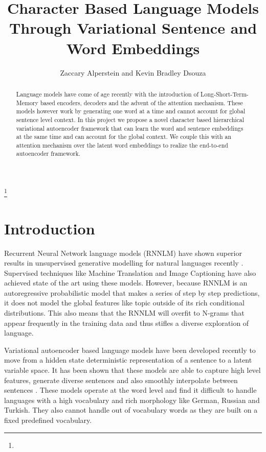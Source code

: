 \documentclass[journal, 12pt, draftcls, onecolumn]{IEEEtran}
\begin{document}
\title{Character Based Language Models Through Variational Sentence and Word Embeddings}
\author{Zaccary Alperstein and Kevin Bradley Dsouza}
{} 

\maketitle
\thanks{}
\begin{abstract}
Language models have come of age recently with the introduction of Long-Short-Term-Memory based encoders, decoders and the advent of the attention mechanism. These models however work by generating one word at a time and cannot account for global sentence level context. In this project we propose a novel character based hierarchical variational autoencoder framework that can learn the word and sentence embeddings at the same time and can account for the global context. We couple this with an attention mechanism over the latent word embeddings to realize the end-to-end autoencoder framework.     
 
\end{abstract}

\section {Introduction} \label{intro}
Recurrent Neural Network language models (RNNLM) have shown superior results in unsupervised generative modelling for natural languages recently \cite{C1}. Supervised techniques like Machine Translation \cite{C2} and Image Captioning \cite{C3} have also achieved state of the art using these models. However, because RNNLM is an autoregressive probabilistic model that makes a series of step by step predictions, it does not model the global features like topic outside of its rich conditional distributions. This also means that the RNNLM will overfit to N-grams that appear frequently in the training data and thus stifles a diverse exploration of language.   

Variational autoencoder based language models have been developed recently to move from a hidden state deterministic representation of a sentence to a latent variable space. It has been shown that these models are able to capture high level features, generate diverse sentences and also smoothly interpolate between sentences \cite{C4}. These models operate at the word level and find it difficult to handle languages with a high vocabulary and rich morphology like German, Russian and Turkish. They also cannot handle out of vocabulary words as they are built on a fixed predefined vocabulary.
\end{document}
